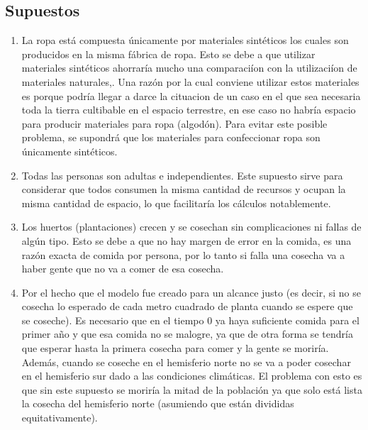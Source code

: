 \documentclass[12pt]{report}
\begin{document}

\subsection*{Supuestos}
\begin{enumerate}
    \item La ropa est\'a compuesta \'unicamente por materiales sint\'eticos los cuales son producidos en la misma f\'abrica de ropa. Esto se debe a que utilizar materiales sint\'eticos ahorrar\'ia mucho una comparaci\'ion con la utilizaci\'ion de materiales naturales,. Una raz\'on por la cual conviene utilizar estos materiales es porque podr\'ia llegar a darce la cituacion de un caso en el que sea necesaria toda la tierra cultibable en el espacio terrestre, en ese caso no habr\'ia espacio para producir materiales para ropa (algod\'on). Para evitar este posible problema, se supondr\'a que los materiales para confeccionar ropa son \'unicamente sint\'eticos.  
    \item Todas las personas son adultas e independientes. Este supuesto sirve para considerar que todos consumen la misma cantidad de recursos y ocupan la misma cantidad de espacio, lo que facilitar\'ia los c\'alculos notablemente.
    \item Los huertos (plantaciones) crecen y se cosechan sin complicaciones ni fallas de alg\'un tipo. Esto se debe a que no hay margen de error en la comida, es una raz\'on exacta de comida por persona, por lo tanto si falla una cosecha va a haber gente que no va a comer de esa cosecha.
    \item Por el hecho que el modelo fue creado para un alcance justo (es decir, si no se cosecha lo esperado de cada metro cuadrado de planta cuando se espere que se coseche). Es necesario que en el tiempo 0 ya haya suficiente comida para el primer a\~no y que esa comida no se malogre, ya que de otra forma se tendr\'ia que esperar hasta la primera cosecha para comer y la gente se morir\'ia. Adem\'as, cuando se coseche en el hemisferio norte no se va a poder cosechar en el hemisferio sur dado a las condiciones clim\'aticas. El problema con esto es que sin este supuesto se morir\'ia la mitad de la poblaci\'on ya que solo est\'a lista la cosecha del hemisferio norte (asumiendo que est\'an divididas equitativamente).
\end{enumerate}
\end{document}
